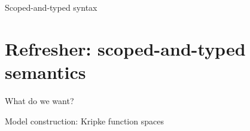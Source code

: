 \documentclass[aspectratio=169]{beamer}
\begin{document}
\begin{frame}{Scoped-and-typed syntax}

  \bigskip

\end{frame}

\section{Refresher: scoped-and-typed semantics}

\begin{frame}{What do we want?}
\end{frame}






\begin{frame}{Model construction: Kripke function spaces}





\end{frame}
\end{document}
